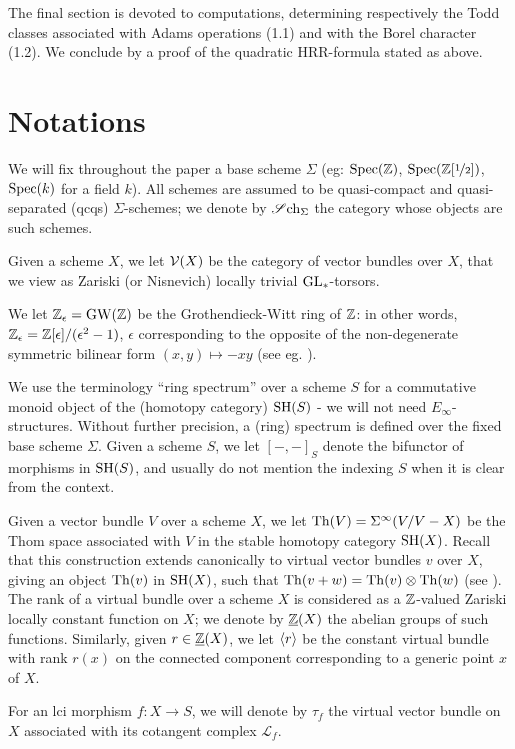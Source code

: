 \documentclass[11pt,leqno]{amsart}
\theoremstyle{remark}
\theoremstyle{definition}
\numberwithin{equation}{thm}
\begin{document}
The final section is devoted to computations, determining respectively the Todd classes associated with Adams operations (1.1)
 and with the Borel character (1.2). We conclude by a proof of the
 quadratic HRR-formula stated as  above. 
 

\section*{Notations}

We will fix throughout the paper a base scheme $\Sigma$
 (eg: $\operatorname{Spec}(\mathbb{Z})$, $\operatorname{Spec}(\mathbb{Z}[\nicefrac 1 2])$, $\operatorname{Spec}(k)$ for a field $k$).
 All schemes are assumed to be quasi-compact and quasi-separated (qcqs) $\Sigma$-schemes;  we denote by $\operatorname{\mathscr Sch_\Sigma}$ the category whose objects are such schemes. 

Given a scheme $X$, we let $\operatorname{\mathcal V}(X)$ be the category of vector bundles over $X$,
 that we view as Zariski (or Nisnevich) locally trivial $\mathrm{GL}_*$-torsors.

We let $\mathbb{Z}_\epsilon=\operatorname{GW}(\mathbb{Z})$ be the Grothendieck-Witt ring of $\mathbb{Z}$:
 in other words, $\mathbb{Z}_\epsilon=\mathbb{Z}[\epsilon]/(\epsilon^2-1)$,
 $\epsilon$ corresponding to the opposite of the non-degenerate symmetric bilinear form $(x,y) \mapsto -xy$
 (see eg. \cite[Rem. 2.1.7]{Deg18}).

We use the terminology ``ring spectrum'' over a scheme $S$ for a commutative monoid object of the (homotopy category) $\operatorname{SH}(S)$
 - we will not need $E_\infty$-structures. Without further precision, a (ring) spectrum is defined
 over the fixed base scheme $\Sigma$.
 Given a scheme $S$, we let $[-,-]_S$ denote the bifunctor of morphisms in $\operatorname{SH}(S)$,
 and usually do not mention the indexing $S$ when it is clear from the context.

Given a vector bundle $V$ over a scheme $X$, we let $\operatorname{Th}(V)=\Sigma^\infty (V/V-X)$ be the Thom space
 associated with $V$ in the stable homotopy category $\operatorname{SH}(X)$.
 Recall that this construction extends canonically to virtual vector bundles $v$ over $X$,
 giving an object $\operatorname{Th}(v)$ in $\operatorname{SH}(X)$, such that $\operatorname{Th}(v+w)= \operatorname{Th}(v) \otimes \operatorname{Th}(w)$
 (see \cite[4.1]{Riou}).
 The rank of a virtual bundle over a scheme $X$ is considered as a $\mathbb{Z}$-valued Zariski locally
 constant function on $X$; we denote by $\operatorname{\underline {\mathbb{Z}}}(X)$ the abelian groups of such functions.
 Similarly, given  $r \in \operatorname{\underline {\mathbb{Z}}}(X)$, we let $\langle r \rangle$ be the constant virtual bundle
 with rank $r(x)$ on the connected component corresponding to a generic point $x$ of $X$.

For an lci morphism $f:X \rightarrow S$, we will denote by $\tau_f$ the virtual vector bundle
 on $X$ associated with its cotangent complex $\mathcal L_f$.
\end{document}
